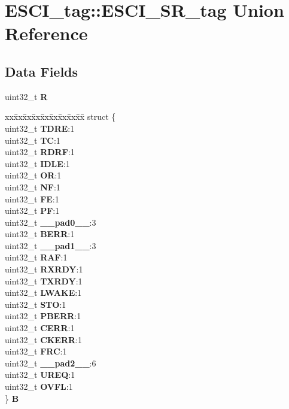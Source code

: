 \hypertarget{unionESCI__tag_1_1ESCI__SR__tag}{}\section{E\+S\+C\+I\+\_\+tag\+::E\+S\+C\+I\+\_\+\+S\+R\+\_\+tag Union Reference}
\label{unionESCI__tag_1_1ESCI__SR__tag}
\subsection*{Data Fields}
\begin{DoxyCompactItemize}
\item 
\mbox{\label{unionESCI__tag_1_1ESCI__SR__tag_a2927f2ca37bb7e303c32ab348128a415}} 
uint32\+\_\+t {\bfseries R}
\item 
\mbox{\label{unionESCI__tag_1_1ESCI__SR__tag_afb3ce7dcec7ac2cdb9b154e59420e5eb}} 
\begin{tabbing}
xx\=xx\=xx\=xx\=xx\=xx\=xx\=xx\=xx\=\kill
struct \{\\
\>uint32\_t {\bfseries TDRE}:1\\
\>uint32\_t {\bfseries TC}:1\\
\>uint32\_t {\bfseries RDRF}:1\\
\>uint32\_t {\bfseries IDLE}:1\\
\>uint32\_t {\bfseries OR}:1\\
\>uint32\_t {\bfseries NF}:1\\
\>uint32\_t {\bfseries FE}:1\\
\>uint32\_t {\bfseries PF}:1\\
\>uint32\_t {\bfseries \_\_pad0\_\_}:3\\
\>uint32\_t {\bfseries BERR}:1\\
\>uint32\_t {\bfseries \_\_pad1\_\_}:3\\
\>uint32\_t {\bfseries RAF}:1\\
\>uint32\_t {\bfseries RXRDY}:1\\
\>uint32\_t {\bfseries TXRDY}:1\\
\>uint32\_t {\bfseries LWAKE}:1\\
\>uint32\_t {\bfseries STO}:1\\
\>uint32\_t {\bfseries PBERR}:1\\
\>uint32\_t {\bfseries CERR}:1\\
\>uint32\_t {\bfseries CKERR}:1\\
\>uint32\_t {\bfseries FRC}:1\\
\>uint32\_t {\bfseries \_\_pad2\_\_}:6\\
\>uint32\_t {\bfseries UREQ}:1\\
\>uint32\_t {\bfseries OVFL}:1\\
\} {\bfseries B}\\


\end{tabbing}
\end{DoxyCompactItemize}
